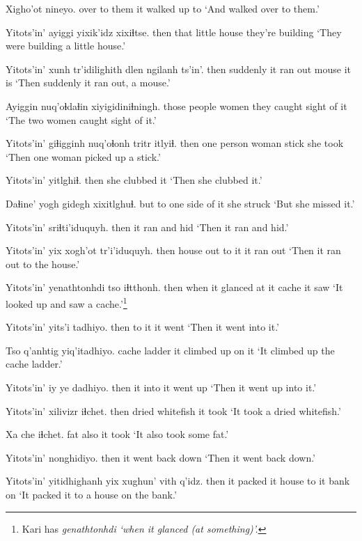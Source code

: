 \documentclass[12pt]{article}
\begin{document}
\gll Xigho'ot nineyo.
{over to them} {it walked up to}
\glt `And walked over to them.'
\glend

\gll Yitots'in' ayiggi yixik'idz xixiɬtse.
then that {little house} {they're building}
\glt `They were building a little house.'
\glend

\gll Yitots'in' xunh tr'idilighith dlen ngilanh ts'in'.
then suddenly {it ran out} mouse {it is}
\glt `Then suddenly it ran out, a mouse.'
\glend

\gll Ayiggin nuq'oɬdaɬin xiyigidiniɬningh.
{those people} women {they caught sight of it }
\glt `The two women caught sight of it.'
\glend

\gll Yitots'in' giɬigginh nuq'oɬonh tritr itlyiɬ.
then {one person} woman stick {she took}
\glt `Then one woman picked up a stick.'
\glend

\gll Yitots'in' yitlghiɬ.
then {she clubbed it}
\glt `Then she clubbed it.'
\glend

\gll Daɬine' {yogh gidegh} xixitlghuɬ.
but {to one side of it} {she struck}
\glt `But she missed it.'
\glend

\gll Yitots'in' sriɬti'iduquyh.
then {it ran and hid}
\glt `Then it ran and hid.'
\glend

\gll Yitots'in' yix xogh'ot tr'i'iduquyh.
then house {out to it} {it ran out}
\glt `Then it ran out to the house.'
\glend

\gll Yitots'in' yenathtonhdi tso iɬtthonh.
then {when it glanced at it} cache {it saw}
\glt `It looked up and saw a cache.'\footnote{Kari has \em genathtonhdi \em `when it glanced (at something)'.}
\glend

\gll Yitots'in' yits'i tadhiyo.
then {to it} {it went}
\glt `Then it went into it.'
\glend

\gll Tso q'anhtig yiq'itadhiyo.
cache ladder {it climbed up on it}
\glt `It climbed up the cache ladder.'
\glend

\gll Yitots'in' iy ye dadhiyo.
then it into {it went up}
\glt `Then it went up into it.'
\glend

\gll Yitots'in' xilivizr iɬchet.
then {dried whitefish} {it took}
\glt `It took a dried whitefish.'
\glend

\gll Xa che iɬchet.
fat also {it took}
\glt `It also took some fat.'
\glend

\gll Yitots'in' nonghidiyo.
then {it went back down}
\glt `Then it went back down.'
\glend

\gll Yitots'in' yitidhighanh yix xughun' vith q'idz.
then {it packed it} house {to it} bank on
\glt `It packed it to a house on the bank.'
\glend
\end{document}
